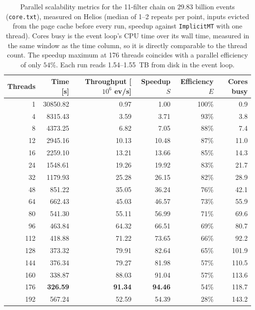\begin{table}[htbp]
\centering
\caption{Parallel scalability metrics for the 11-filter chain on $29.83$ billion events (\texttt{core.txt}), measured on Helios (median of 1--2 repeats per point, inputs evicted from the page cache before every run, speedup against \texttt{ImplicitMT} with one thread). Cores busy is the event loop's CPU time over its wall time, measured in the same window as the time column, so it is directly comparable to the thread count. The speedup maximum at 176 threads coincides with a parallel efficiency of only $54\%$. Each run reads 1.54--1.55~TB from disk in the event loop.}
\label{tab:scalability-chain11}
\begin{tabular}{rrrrrr}
\toprule
Threads & Time [s] & Throughput [$10^6$ ev/s] & Speedup $S$ & Efficiency $E$ & Cores busy \\
\midrule
 1 & 30850.82 & 0.97 & 1.00 & 100\% & 0.9 \\
 4 & 8315.43 & 3.59 & 3.71 & 93\% & 3.8 \\
 8 & 4373.25 & 6.82 & 7.05 & 88\% & 7.4 \\
12 & 2945.16 & 10.13 & 10.48 & 87\% & 11.0 \\
16 & 2259.10 & 13.21 & 13.66 & 85\% & 14.3 \\
24 & 1548.61 & 19.26 & 19.92 & 83\% & 21.7 \\
32 & 1179.93 & 25.28 & 26.15 & 82\% & 28.9 \\
48 & 851.22 & 35.05 & 36.24 & 76\% & 42.1 \\
64 & 662.43 & 45.03 & 46.57 & 73\% & 55.9 \\
80 & 541.30 & 55.11 & 56.99 & 71\% & 69.6 \\
96 & 463.84 & 64.32 & 66.51 & 69\% & 80.7 \\
112 & 418.88 & 71.22 & 73.65 & 66\% & 92.2 \\
128 & 373.32 & 79.91 & 82.64 & 65\% & 101.9 \\
144 & 376.34 & 79.27 & 81.98 & 57\% & 110.5 \\
160 & 338.87 & 88.03 & 91.04 & 57\% & 113.6 \\
176 & \textbf{326.59} & \textbf{91.34} & \textbf{94.46} & 54\% & 118.7 \\
192 & 567.24 & 52.59 & 54.39 & 28\% & 143.2 \\
\bottomrule
\end{tabular}
\end{table}

